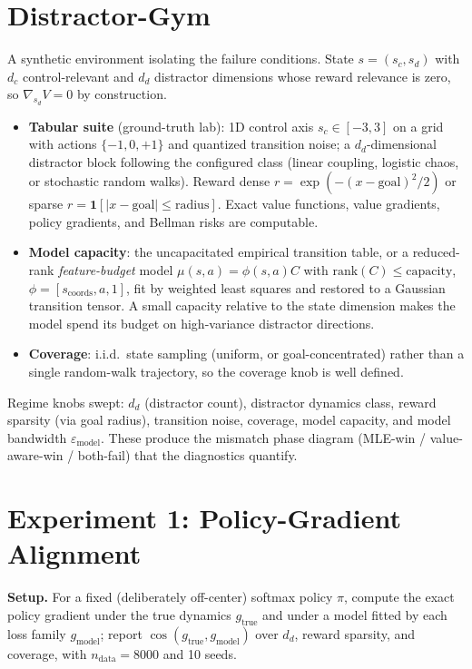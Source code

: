 \documentclass{article}
\theoremstyle{plain}
\begin{document}
\section{Distractor-Gym}

A synthetic environment isolating the failure conditions. State $s = (s_c, s_d)$ with
$d_c$ control-relevant and $d_d$ distractor dimensions whose reward relevance is zero,
so $\nabla_{s_d} V = 0$ by construction.

\begin{itemize}
\item \textbf{Tabular suite} (ground-truth lab): 1D control axis $s_c \in [-3, 3]$ on a
  grid with actions $\{-1, 0, +1\}$ and quantized transition noise; a $d_d$-dimensional
  distractor block following the configured class (linear coupling, logistic chaos, or
  stochastic random walks). Reward dense
  $r = \exp\!\left(-(x - \mathrm{goal})^2/2\right)$ or sparse
  $r = \mathbf{1}[\lvert x - \mathrm{goal}\rvert \le \mathrm{radius}]$. Exact value
  functions, value gradients, policy gradients, and Bellman risks are computable.
\item \textbf{Model capacity}: the uncapacitated empirical transition table, or a
  reduced-rank \emph{feature-budget} model
  $\mu(s,a) = \phi(s,a) C$ with $\mathrm{rank}(C) \le \mathrm{capacity}$,
  $\phi = [s_{\text{coords}}, a, 1]$, fit by weighted least squares and restored to a
  Gaussian transition tensor. A small capacity relative to the state dimension makes the
  model spend its budget on high-variance distractor directions.
\item \textbf{Coverage}: i.i.d.\ state sampling (uniform, or goal-concentrated) rather
  than a single random-walk trajectory, so the coverage knob is well defined.
\end{itemize}

Regime knobs swept: $d_d$ (distractor count), distractor dynamics class, reward sparsity
(via goal radius), transition noise, coverage, model capacity, and model bandwidth
$\varepsilon_{\mathrm{model}}$. These produce the mismatch phase diagram
(MLE-win / value-aware-win / both-fail) that the diagnostics quantify.

\section{Experiment 1: Policy-Gradient Alignment}

\textbf{Setup.} For a fixed (deliberately off-center) softmax policy $\pi$, compute the
exact policy gradient under the true dynamics $g_{\text{true}}$ and under a model fitted
by each loss family $g_{\mathrm{model}}$; report
$\cos(g_{\text{true}}, g_{\mathrm{model}})$ over $d_d$, reward sparsity, and coverage,
with $n_{\text{data}} = 8000$ and 10 seeds.
\end{document}
